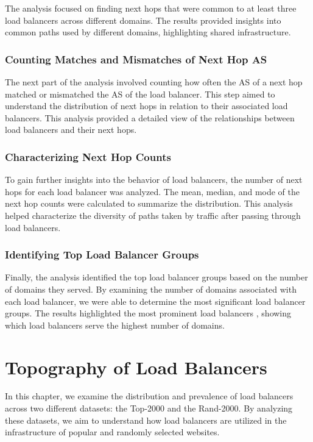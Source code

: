 \documentclass[12pt]{cwru_thesis}
\begin{document}
The analysis focused on finding next hops that were common to at least three load balancers across different domains. The results provided insights into common paths used by different domains, highlighting shared infrastructure.

\subsection{Counting Matches and Mismatches of Next Hop AS}

The next part of the analysis involved counting how often the AS of a next hop matched or mismatched the AS of the load balancer. This step aimed to understand the distribution of next hops in relation to their associated load balancers. This analysis provided a detailed view of the relationships between load balancers and their next hops.

\subsection{Characterizing Next Hop Counts}

To gain further insights into the behavior of load balancers, the number of next hops for each load balancer was analyzed. The mean, median, and mode of the next hop counts were calculated to summarize the distribution. This analysis helped characterize the diversity of paths taken by traffic after passing through load balancers.



\subsection{Identifying Top Load Balancer Groups}

Finally, the analysis identified the top load balancer groups based on the number of domains they served. By examining the number of domains associated with each load balancer, we were able to determine the most significant load balancer groups. The results highlighted the most prominent load balancers , showing which load balancers serve the highest number of domains. 




\chapter{Topography of Load Balancers}

In this chapter, we examine the distribution and prevalence of load balancers across two different datasets: the Top-2000 and the Rand-2000. By analyzing these datasets, we aim to understand how load balancers are utilized in the infrastructure of popular and randomly selected websites. 
\end{document}
